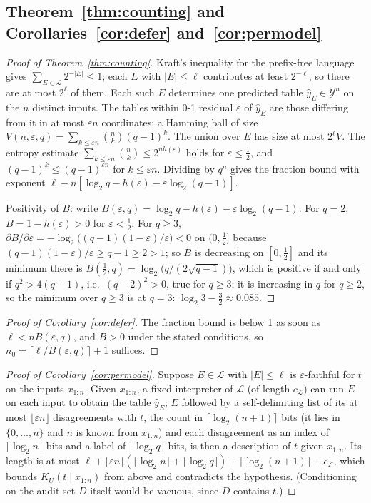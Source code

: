 \documentclass[11pt,letterpaper]{article}
\newcommand{\Y}{\mathcal{Y}}
\newcommand{\Lang}{\mathcal{L}}
\newcommand{\D}{D}
\newcommand{\Ltwo}{\log_{2}}
\theoremstyle{plain}
\theoremstyle{definition}
\theoremstyle{remark}
\begin{document}
\subsection{Theorem~\ref{thm:counting} and Corollaries~\ref{cor:defer} and~\ref{cor:permodel}}
\begin{proof}[Proof of Theorem~\ref{thm:counting}]
Kraft's inequality for the prefix-free language gives $\sum_{E\in\Lang}2^{-|E|}\le1$; each $E$ with $|E|\le\ell$ contributes at least $2^{-\ell}$, so there are at most $2^{\ell}$ of them. Each such $E$ determines one predicted table $\hat y_E\in\Y^{n}$ on the $n$ distinct inputs. The tables within 0-1 residual $\varepsilon$ of $\hat y_E$ are those differing from it in at most $\varepsilon n$ coordinates: a Hamming ball of size $V(n,\varepsilon,q)=\sum_{k\le\varepsilon n}\binom nk(q-1)^{k}$. The union over $E$ has size at most $2^{\ell}V$. The entropy estimate $\sum_{k\le\varepsilon n}\binom nk\le2^{nh(\varepsilon)}$ holds for $\varepsilon\le\frac12$, and $(q-1)^{k}\le(q-1)^{\varepsilon n}$ for $k\le\varepsilon n$. Dividing by $q^{n}$ gives the fraction bound with exponent $\ell-n[\Ltwo q-h(\varepsilon)-\varepsilon\Ltwo(q-1)]$.

Positivity of $B$: write $B(\varepsilon,q)=\Ltwo q-h(\varepsilon)-\varepsilon\Ltwo(q-1)$. For $q=2$, $B=1-h(\varepsilon)>0$ for $\varepsilon<\frac12$. For $q\ge3$, $\partial B/\partial\varepsilon=-\Ltwo\big((q-1)(1-\varepsilon)/\varepsilon\big)<0$ on $(0,\frac12]$ because $(q-1)(1-\varepsilon)/\varepsilon\ge q-1\ge2>1$; so $B$ is decreasing on $[0,\frac12]$ and its minimum there is $B(\frac12,q)=\Ltwo\big(q/(2\sqrt{q-1})\big)$, which is positive if and only if $q^{2}>4(q-1)$, i.e.\ $(q-2)^{2}>0$, true for $q\ge3$; it is increasing in $q$ for $q\ge2$, so the minimum over $q\ge3$ is at $q=3$: $\Ltwo3-\frac32\approx0.085$.
\end{proof}

\begin{proof}[Proof of Corollary~\ref{cor:defer}]
The fraction bound is below 1 as soon as $\ell<nB(\varepsilon,q)$, and $B>0$ under the stated conditions, so $n_0=\lceil\ell/B(\varepsilon,q)\rceil+1$ suffices.
\end{proof}

\begin{proof}[Proof of Corollary~\ref{cor:permodel}]
Suppose $E\in\Lang$ with $|E|\le\ell$ is $\varepsilon$-faithful for $t$ on the inputs $x_{1:n}$. Given $x_{1:n}$, a fixed interpreter of $\Lang$ (of length $c_{\Lang}$) can run $E$ on each input to obtain the table $\hat y_E$; $E$ followed by a self-delimiting list of its at most $\lfloor\varepsilon n\rfloor$ disagreements with $t$, the count in $\lceil\Ltwo(n+1)\rceil$ bits (it lies in $\{0,\dots,n\}$ and $n$ is known from $x_{1:n}$) and each disagreement as an index of $\lceil\Ltwo n\rceil$ bits and a label of $\lceil\Ltwo q\rceil$ bits, is then a description of $t$ given $x_{1:n}$. Its length is at most $\ell+\lfloor\varepsilon n\rfloor(\lceil\Ltwo n\rceil+\lceil\Ltwo q\rceil)+\lceil\Ltwo(n+1)\rceil+c_{\Lang}$, which bounds $K_U(t\mid x_{1:n})$ from above and contradicts the hypothesis. (Conditioning on the audit set $\D$ itself would be vacuous, since $\D$ contains $t$.)
\end{proof}
\end{document}
